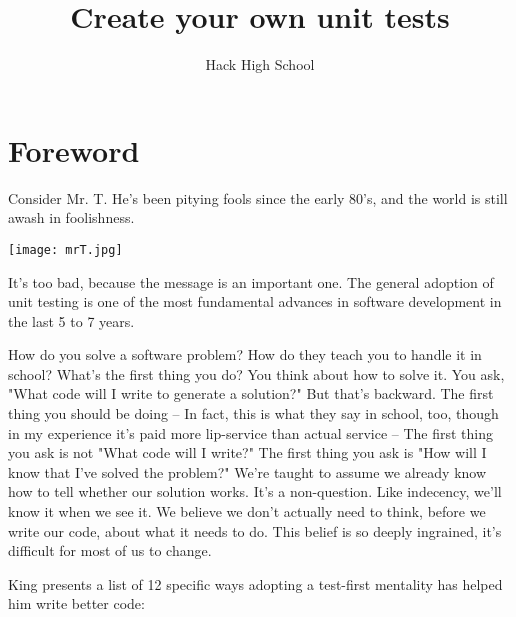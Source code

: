\documentclass{42-en}
\begin{document}
    \title{Create your own unit tests}
    \subtitle{Hack High School}

\maketitle

\tableofcontents

\chapter{Foreword}
Consider Mr. T. He's been pitying fools since the early 80's, and the world is still awash in foolishness.

\begin{center}
    \texttt{[image: mrT.jpg]}
\end{center}

It's too bad, because the message is an important one. The general adoption of unit testing is one of the most fundamental advances in software development in the last 5 to 7 years.

How do you solve a software problem? How do they teach you to handle it in school? What's the first thing you do? You think about how to solve it. You ask, "What code will I write to generate a solution?" But that's backward. The first thing you should be doing -- In fact, this is what they say in school, too, though in my experience it's paid more lip-service than actual service -- The first thing you ask is not "What code will I write?" The first thing you ask is "How will I know that I've solved the problem?"
We're taught to assume we already know how to tell whether our solution works. It's a non-question. Like indecency, we'll know it when we see it. We believe we don't actually need to think, before we write our code, about what it needs to do. This belief is so deeply ingrained, it's difficult for most of us to change.

King presents a list of 12 specific ways adopting a test-first mentality has helped him write better code:
\end{document}
